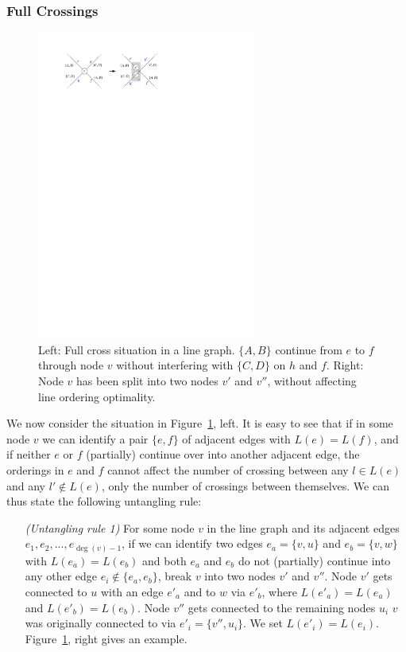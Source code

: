 \documentclass[format=acmsmall, review=false, screen=true]{acmart}
\begin{document}
\subsubsection{Full Crossings}

\begin{figure}
  \centering
  \includegraphics[width=0.64\textwidth]{figures/untangling/fullcross.pdf}
  \caption{Left: Full cross situation in a line graph. $\{A, B\}$ continue from $e$ to $f$ through node $v$ without interfering with $\{C, D\}$ on $h$ and $f$. Right: Node $v$ has been split into two nodes $v'$ and $v''$, without affecting line ordering optimality.}  
  \label{FIG:untangle_fullcross}
\end{figure}

We now consider the situation in Figure~\ref{FIG:untangle_fullcross}, left.
It is easy to see that if in some node $v$ we can identify a pair $\{e, f\}$ of adjacent edges with $L(e) = L(f)$, and if neither $e$ or $f$ (partially) continue over into another adjacent edge, the orderings in $e$ and $f$ cannot affect the number of crossing between any $l \in L(e)$ and any $l' \not\in L(e)$, only the number of crossings between themselves.
We can thus state the following untangling rule:
\begin{enumerate}[parsep=0.5mm, wide, labelwidth=0mm, itemindent=2.3mm]
  \setlength\itemsep{1pt}
  \item[\emph{(Untangling rule 1)}] For some node $v$ in the line graph and its adjacent edges $e_1, e_2, ..., e_{\deg(v)-1}$, if we can identify two edges $e_a = \{v, u\}$ and $e_b = \{v, w\}$ with $L(e_a) = L(e_b)$ and both $e_a$ and $e_b$ do not (partially) continue into any other edge $e_i \not\in \{e_a, e_b\}$, break $v$ into two nodes $v'$ and $v''$.
  Node $v'$ gets connected to $u$ with an edge $e'_a$ and to $w$ via $e'_b$, where $L(e'_a) = L(e_a)$ and $L(e'_b) = L(e_b)$. Node $v''$ gets connected to the remaining nodes $u_i$ $v$ was originally connected to via $e'_i = \{v'', u_i\}$. We set $L(e'_i) = L(e_i)$. Figure~\ref{FIG:untangle_fullcross}, right gives an example.
\end{enumerate}
\end{document}
